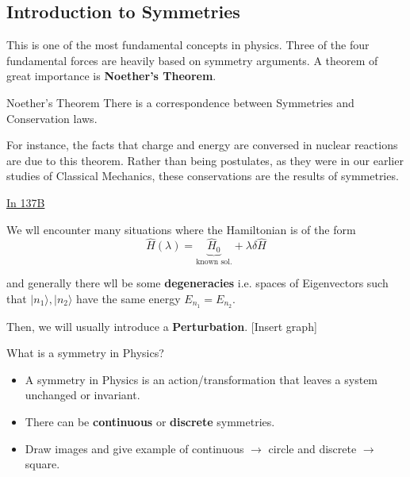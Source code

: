 \documentclass{article}
\newcommand{\ket}[1]{|#1 \rangle}
\begin{document}
\vskip 1cm
\subsection{Introduction to Symmetries}

This is one of the most fundamental concepts in physics. Three of the four fundamental forces are heavily based on symmetry arguments. A theorem of great importance is \textbf{Noether's Theorem}.

\begin{mathdefinitionbox}{Noether's Theorem}
  There is a correspondence between Symmetries and Conservation laws.
\end{mathdefinitionbox}

\vskip 0.5cm
For instance, the facts that charge and energy are conversed in nuclear reactions are due to this theorem. Rather than being postulates, as they were in our earlier studies of Classical Mechanics, these conservations are the results of symmetries.

\vskip 0.5cm
\underline{In 137B}
 
We wll encounter many situations where the Hamiltonian is of the form 
\[  \hat{H}(\lambda) = \underbrace{\hat{H}_0}_{\text{known sol.}} + \lambda \delta \hat{H}\]

and generally there wll be some \textbf{degeneracies} i.e. spaces of Eigenvectors such that $\ket{n_1}, \ket{n_2}$ have the same energy $E_{n_1} = E_{n_2}$.

\vskip 0.5cm
Then, we will usually introduce a \textbf{Perturbation}. [Insert graph]

\vskip 0.5cm
\begin{mathdefinitionbox}{What is a symmetry in Physics?}
  \begin{itemize}
    \item A symmetry in Physics is an action/transformation that leaves a system unchanged or invariant.
    \item There can be \textbf{continuous} or \textbf{discrete} symmetries.
    \item Draw images and give example of continuous $\rightarrow$ circle and discrete $\rightarrow$ square.
  \end{itemize}
\end{mathdefinitionbox}
\end{document}
